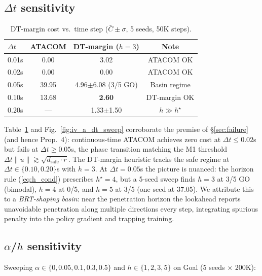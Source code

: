 \subsection{$\Delta t$ sensitivity}
\label{sec:dt-sweep}

\begin{table}[t]
\centering
\caption{DT-margin cost vs.\ time step ($\bar C \pm \sigma$, 5 seeds, 50K steps).}
\label{tab:dt}
\begin{tabular}{lccc}
\toprule
$\Delta t$ & ATACOM & DT-margin ($h{=}3$) & Note \\
\midrule
0.01s  & 0.00  & 3.02 & ATACOM OK \\
0.02s  & 0.00  & 0.00 & ATACOM OK \\
0.05s  & 39.95 & 4.96$\pm$6.08 (3/5 GO) & Basin regime \\
0.10s  & 13.68 & \textbf{2.60} & DT-margin OK \\
0.20s  &  ---  & 1.33$\pm$1.50 & $h\!\gg\!h^\star$ \\
\bottomrule
\end{tabular}
\end{table}



Table~\ref{tab:dt} and Fig.~\ref{fig:iv_a_dt_sweep} corroborate the premise of \S\ref{sec:failure} (and hence Prop.~4): continuous-time ATACOM achieves zero cost at $\Delta t \le 0.02$s but fails at $\Delta t \ge 0.05$s, the phase transition matching the M1 threshold $\Delta t\|u\| \gtrsim \sqrt{d_\text{safe}\cdot r}$. The DT-margin heuristic tracks the safe regime at $\Delta t \in \{0.10, 0.20\}$s with $h{=}3$. At $\Delta t{=}0.05$s the picture is nuanced: the horizon rule (\ref{eq:h_cond}) prescribes $h^\star{=}4$, but a 5-seed sweep finds $h{=}3$ at 3/5 GO (bimodal), $h{=}4$ at 0/5, and $h{=}5$ at 3/5 (one seed at 37.05). We attribute this to a \emph{BRT-shaping basin}: near the penetration horizon the lookahead reports unavoidable penetration along multiple directions every step, integrating spurious penalty into the policy gradient and trapping training.

\subsection{$\alpha$/$h$ sensitivity}
\label{sec:alpha-h-sweep}

Sweeping $\alpha \in \{0, 0.05, 0.1, 0.3, 0.5\}$ and $h \in \{1, 2, 3, 5\}$ on Goal (5 seeds $\times$ 200K):

